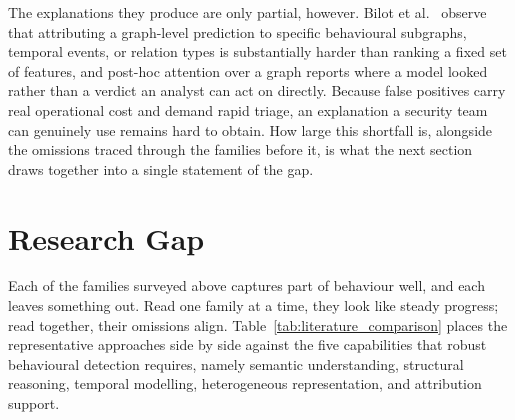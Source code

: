 \documentclass[%
    BCOR=10mm,
    DIV=13,
    toc=bibliography,
    toc=listof,
    oneside,
    12pt,
]{scrbook}
\begin{document}
The explanations they produce are only partial, however. Bilot et
al.~\cite{bilot2024survey} observe that attributing a graph-level prediction to
specific behavioural subgraphs, temporal events, or relation types is substantially
harder than ranking a fixed set of features, and post-hoc attention over a graph
reports where a model looked rather than a verdict an analyst can act on directly.
Because false positives carry real operational cost and demand rapid triage, an
explanation a security team can genuinely use remains hard to obtain. How large this
shortfall is, alongside the omissions traced through the families before it, is what
the next section draws together into a single statement of the gap.

\section{Research Gap}
\label{sec:research_gap}

\begingroup
\sloppy

Each of the families surveyed above captures part of behaviour well, and each
leaves something out. Read one family at a time, they look like steady progress;
read together, their omissions align. Table~\ref{tab:literature_comparison} places
the representative approaches side by side against the five capabilities that robust
behavioural detection requires, namely semantic understanding, structural reasoning,
temporal modelling, heterogeneous representation, and attribution support.
\end{document}
